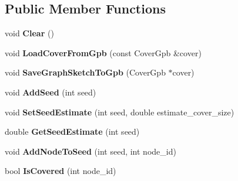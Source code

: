 \subsection*{Public Member Functions}
\begin{DoxyCompactItemize}
\item 
\hypertarget{classall__distance__sketch_1_1Cover_a0703d46dbcfb9f8a9613e1a812ac24af}{}void {\bfseries Clear} ()\label{classall__distance__sketch_1_1Cover_a0703d46dbcfb9f8a9613e1a812ac24af}

\item 
\hypertarget{classall__distance__sketch_1_1Cover_a5ae722b8c9aa9f054c5389aad0ca712e}{}void {\bfseries Load\+Cover\+From\+Gpb} (const Cover\+Gpb \&cover)\label{classall__distance__sketch_1_1Cover_a5ae722b8c9aa9f054c5389aad0ca712e}

\item 
\hypertarget{classall__distance__sketch_1_1Cover_afd0c85bdb247c60c376e20ae4ce18ee2}{}void {\bfseries Save\+Graph\+Sketch\+To\+Gpb} (Cover\+Gpb $\ast$cover)\label{classall__distance__sketch_1_1Cover_afd0c85bdb247c60c376e20ae4ce18ee2}

\item 
\hypertarget{classall__distance__sketch_1_1Cover_a91636b2e6a4df8339448ead2781f862f}{}void {\bfseries Add\+Seed} (int seed)\label{classall__distance__sketch_1_1Cover_a91636b2e6a4df8339448ead2781f862f}

\item 
\hypertarget{classall__distance__sketch_1_1Cover_afb619d47213da014e2a46041dd267ca1}{}void {\bfseries Set\+Seed\+Estimate} (int seed, double estimate\+\_\+cover\+\_\+size)\label{classall__distance__sketch_1_1Cover_afb619d47213da014e2a46041dd267ca1}

\item 
\hypertarget{classall__distance__sketch_1_1Cover_a9a0b15d23416014c8d5a7ee01f966a8e}{}double {\bfseries Get\+Seed\+Estimate} (int seed)\label{classall__distance__sketch_1_1Cover_a9a0b15d23416014c8d5a7ee01f966a8e}

\item 
\hypertarget{classall__distance__sketch_1_1Cover_a2e28c97e046a454311f58a8f6737b5d5}{}void {\bfseries Add\+Node\+To\+Seed} (int seed, int node\+\_\+id)\label{classall__distance__sketch_1_1Cover_a2e28c97e046a454311f58a8f6737b5d5}

\item 
\hypertarget{classall__distance__sketch_1_1Cover_a7f40f29a281a0a61d675083103e8f5d2}{}bool {\bfseries Is\+Covered} (int node\+\_\+id)\label{classall__distance__sketch_1_1Cover_a7f40f29a281a0a61d675083103e8f5d2}


\end{DoxyCompactItemize}
